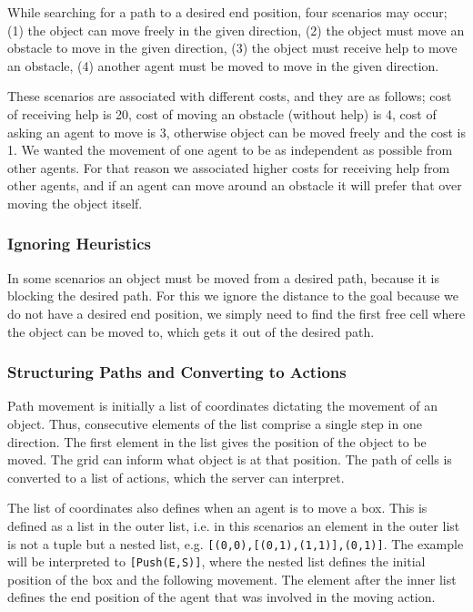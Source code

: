 While searching for a path to a desired end position, four scenarios may occur; (1) the object can move freely in the given direction, (2) the object must move an obstacle to move in the given direction, (3) the object must receive help to move an obstacle, (4) another agent must be moved to move in the given direction.

These scenarios are associated with different costs, and they are as follows; cost of receiving help is 20, cost of moving an obstacle (without help) is 4, cost of asking an agent to move is 3, otherwise object can be moved freely and the cost is 1.
We wanted the movement of one agent to be as independent as possible from other agents.
For that reason we associated higher costs for receiving help from other agents, and if an agent can move around an obstacle it will prefer that over moving the object itself.

\subsubsection{Ignoring Heuristics}

In some scenarios an object must be moved from a desired path, because it is blocking the desired path.
For this we ignore the distance to the goal because we do not have a desired end position, we simply need to find the first free cell where the object can be moved to, which gets it out of the desired path.

\subsubsection{Structuring Paths and Converting to Actions}

Path movement is initially a list of coordinates dictating the movement of an object.
Thus, consecutive elements of the list comprise a single step in one direction.
The first element in the list gives the position of the object to be moved.
The grid can inform what object is at that position.
The path of cells is converted to a list of actions, which the server can interpret.

The list of coordinates also defines when an agent is to move a box.
This is defined as a list in the outer list, i.e. in this scenarios an element in the outer list is not a tuple but a nested list, e.g. \texttt{[(0,0),[(0,1),(1,1)],(0,1)]}.
The example will be interpreted to \texttt{[Push(E,S)]}, where the nested list defines the initial position of the box and the following movement.
The element after the inner list defines the end position of the agent that was involved in the moving action.
